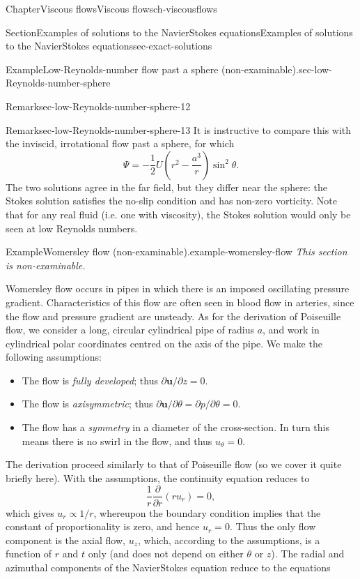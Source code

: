 \documentclass[oneside,10pt,]{book}
\newcommand{\ptxlistdisc}{\raisebox{0.3ex}{\textbullet}}
\numberwithin{equation}{section}
\newcommand{\pd}[2]{\frac{\partial#1}{\partial#2}}
\newcommand{\bu}{\boldsymbol{u}}
\begin{document}
\begin{chapterptx}{Chapter}{Viscous flows}{}{Viscous flows}{}{}{ch-viscousflows}
\begin{sectionptx}{Section}{Examples of solutions to the Navier\textendash{}Stokes equations}{}{Examples of solutions to the Navier\textendash{}Stokes equations}{}{}{sec-exact-solutions}
\begin{example}{Example}{Low-Reynolds-number flow past a sphere (non-examinable).}{sec-low-Reynolds-number-sphere}
\begin{remark}{Remark}{}{sec-low-Reynolds-number-sphere-12}
\end{remark}
\begin{remark}{Remark}{}{sec-low-Reynolds-number-sphere-13}%
It is instructive to compare this with the inviscid, irrotational flow past a sphere, for which%
\begin{equation*}
\Psi=-\frac12U\left(r^2-\frac{a^3}{r}\right)\sin^2\theta.
\end{equation*}
The two solutions agree in the far field, but they differ near the sphere: the Stokes solution satisfies the no-slip condition and has non-zero vorticity. Note that for any real fluid (i.e. one with viscosity), the Stokes solution would only be seen at low Reynolds numbers.%
\end{remark}
\end{example}
\begin{example}{Example}{Womersley flow (non-examinable).}{example-womersley-flow}%
\emph{This section is non-examinable.}%
\par
Womersley flow occurs in pipes in which there is an imposed oscillating pressure gradient. Characteristics of this flow are often seen in blood flow in arteries, since the flow and pressure gradient are unsteady. As for the derivation of Poiseuille flow, we consider a long, circular cylindrical pipe of radius \(a\), and work in cylindrical polar coordinates centred on the axis of the pipe. We make the following assumptions:%
\begin{itemize}[label=\ptxlistdisc]
\item{}The flow is \emph{fully developed}; thus \(\partial\bu/\partial z=0\).%
\item{}The flow is \emph{axisymmetric}; thus \(\partial\bu/\partial\theta=\partial p/\partial\theta=0\).%
\item{}The flow has a \emph{symmetry} in a diameter of the cross-section. In turn this means there is no swirl in the flow, and thus \(u_\theta=0\).%
\end{itemize}
The derivation proceed similarly to that of Poiseuille flow (so we cover it quite briefly here). With the assumptions, the continuity equation reduces to%
\begin{equation*}
\frac1r\pd{}{r}\left(ru_r\right)=0,
\end{equation*}
which gives \(u_r\propto1/r\), whereupon the boundary condition implies that the constant of proportionality is zero, and hence \(u_r=0\). Thus the only flow component is the axial flow, \(u_z\), which, according to the assumptions, is a function of \(r\) and \(t\) only (and does not depend on either \(\theta\) or \(z\)). The radial and azimuthal components of the Navier\textendash{}Stokes equation reduce to the equations%

\end{example}
\end{sectionptx}
\end{chapterptx}
\end{document}
